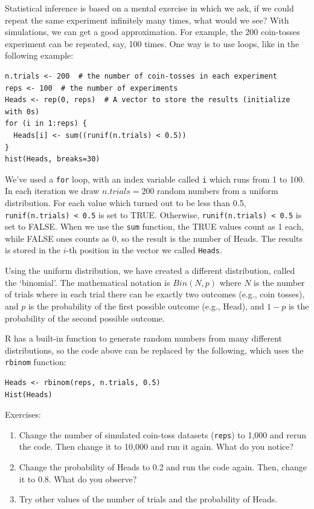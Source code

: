 \documentclass[11pt]{article}
\theoremstyle{definition}
\begin{document}
Statistical inference is based on a mental exercise in which we ask, if we could repeat the same experiment infinitely many times, what would we see? With simulations, we can get a good approximation. For example, the 200 coin-tosses experiment can be repeated, say, 100 times. One way is to use loops, like in the following example:
\begin{verbatim}
n.trials <- 200  # the number of coin-tosses in each experiment
reps <- 100  # the number of experiments
Heads <- rep(0, reps)  # A vector to store the results (initialize with 0s)
for (i in 1:reps) {
  Heads[i] <- sum((runif(n.trials) < 0.5))
}
hist(Heads, breaks=30)
\end{verbatim}
We've used a \texttt{for} loop, with an index variable called \texttt{i} which runs from 1 to 100. In each iteration we draw $n.trials=200$ random numbers from a uniform distribution. For each value which turned out to be less than 0.5, \texttt{runif(n.trials) < 0.5} is set to TRUE. Otherwise, \texttt{runif(n.trials) < 0.5} is set to FALSE. When we use the \texttt{sum} function, the TRUE values count as 1 each, while FALSE ones counts as 0, so the result is the number of Heads. The results is stored in the $i$-th position in the vector we called \texttt{Heads}.

Using the uniform distribution, we have created a different distribution, called the `binomial'. The mathematical notation is $Bin(N, p)$ where $N$ is the number of trials where in each trial there can be exactly two outcomes (e.g., coin tosses), and $p$ is the probability of the first possible outcome (e.g., Head), and $1-p$ is the probability of the second possible outcome.

R has a built-in function to generate random numbers from many different distributions, so the code above can be replaced by the following, which uses the \texttt{rbinom} function:
\begin{verbatim}
Heads <- rbinom(reps, n.trials, 0.5)
Hist(Heads)
\end{verbatim}

Exercises:
\begin{enumerate}
\item Change the number of simulated coin-toss datasets (\texttt{reps}) to 1,000 and rerun the code. Then change it to 10,000 and run it again. What do you notice?
\item Change the probability of Heads to 0.2 and run the code again. Then, change it to 0.8. What do you observe?
\item Try other values of the number of trials and the probability of Heads.
\end{enumerate}
\end{document}
